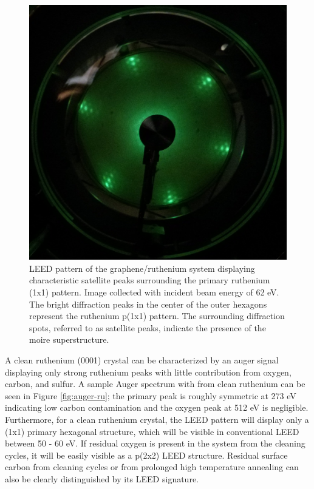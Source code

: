 \begin{figure}
\centering
\includegraphics[scale=0.20]{./figs/graphene-ruthenium-leed.png}
\caption{
LEED pattern of the graphene/ruthenium system displaying characteristic satellite peaks surrounding the primary ruthenium (1x1) pattern. Image collected with incident beam energy of 62 eV. The bright diffraction peaks in the center of the outer hexagons represent the ruthenium p(1x1) pattern. The surrounding diffraction spots, referred to as satellite peaks, indicate the presence of the moire superstructure. 
}
\label{fig:graphene-leed}

\end{figure}


A clean ruthenium (0001) crystal can be characterized by an auger signal displaying only strong ruthenium peaks with little contribution from oxygen, carbon, and sulfur. A sample Auger spectrum with from clean ruthenium can be seen in Figure \ref{fig:auger-ru}; the primary peak is roughly symmetric at 273 eV indicating low carbon contamination and the oxygen peak at 512 eV is negligible.  Furthermore, for a clean ruthenium crystal, the LEED pattern will display only a (1x1) primary hexagonal structure, which will be visible in conventional LEED between 50 - 60 eV. If residual oxygen is present in the system from the cleaning cycles, it will be easily visible as a p(2x2) LEED structure. Residual surface carbon from cleaning cycles or from prolonged high temperature annealing can also be clearly distinguished by its LEED signature.

